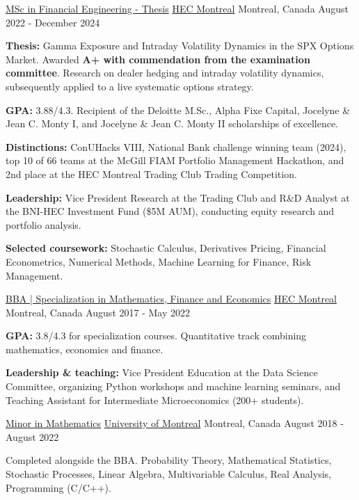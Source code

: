 \begin{cventries}
  \cventry
    {\href{https://www.hec.ca/en/programs/masters/master-financial-engineering}{MSc in Financial Engineering - Thesis}}
    {\href{https://www.hec.ca/en}{HEC Montreal}}
    {Montreal, Canada}
    {August 2022 - December 2024}
    {
      \begin{cvitems}
        \item{\textbf{Thesis:} Gamma Exposure and Intraday Volatility Dynamics in the SPX Options Market. Awarded \textbf{A+ with commendation from the examination committee}. Research on dealer hedging and intraday volatility dynamics, subsequently applied to a live systematic options strategy.}
        \item{\textbf{GPA:} 3.88/4.3. Recipient of the Deloitte M.Sc., Alpha Fixe Capital, Jocelyne \& Jean C. Monty I, and Jocelyne \& Jean C. Monty II scholarships of excellence.}
        \item{\textbf{Distinctions:} ConUHacks VIII, National Bank challenge winning team (2024), top 10 of 66 teams at the McGill FIAM Portfolio Management Hackathon, and 2nd place at the HEC Montreal Trading Club Trading Competition.}
        \item{\textbf{Leadership:} Vice President Research at the Trading Club and R\&D Analyst at the BNI-HEC Investment Fund (\$5M AUM), conducting equity research and portfolio analysis.}
        \item{\textbf{Selected coursework:} Stochastic Calculus, Derivatives Pricing, Financial Econometrics, Numerical Methods, Machine Learning for Finance, Risk Management.}
      \end{cvitems}
    }
  \cventry
    {\href{https://www.hec.ca/etudiants/mon-programme/baa/specialisations/economie-appliquee-finance-mathematiques.html}{BBA | Specialization in Mathematics, Finance and Economics}}
    {\href{https://www.hec.ca/en}{HEC Montreal}}
    {Montreal, Canada}
    {August 2017 - May 2022}
    {
      \begin{cvitems}
        \item{\textbf{GPA:} 3.8/4.3 for specialization courses. Quantitative track combining mathematics, economics and finance.}
        \item{\textbf{Leadership \& teaching:} Vice President Education at the Data Science Committee, organizing Python workshops and machine learning seminars, and Teaching Assistant for Intermediate Microeconomics (200+ students).}
      \end{cvitems}
    }
  \cventry
    {\href{https://admission.umontreal.ca/programmes/mineure-en-mathematiques/}{Minor in Mathematics}}
    {\href{https://www.umontreal.ca/en/}{University of Montreal}}
    {Montreal, Canada}
    {August 2018 - August 2022}
    {
      \begin{cvitems}
        \item{Completed alongside the BBA. Probability Theory, Mathematical Statistics, Stochastic Processes, Linear Algebra, Multivariable Calculus, Real Analysis, Programming (C/C++).}
      \end{cvitems}
    }
\end{cventries}
